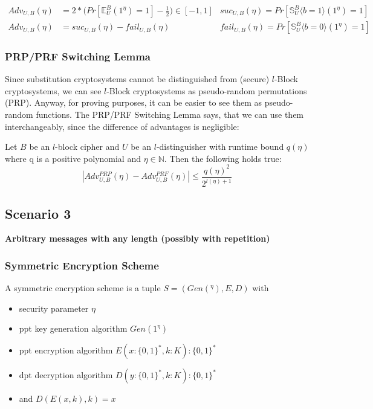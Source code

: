 \begin{align*}
    Adv_{U, B}(\eta) &= 2 * \bigg( Pr[\mathbb{E}_U^B(1^\eta) = 1] - \frac{1}{2} \bigg) \in [-1, 1]
    &suc_{U, B}(\eta) = Pr[\mathbb{S}_U^B\langle b=1\rangle (1^\eta) = 1]\\
    Adv_{U, B}(\eta) &= suc_{U, B}(\eta) - fail_{U, B}(\eta)
    &fail_{U, B}(\eta) = Pr[\mathbb{S}_U^B\langle b=0\rangle (1^\eta) = 1]  
\end{align*}

\hypertarget{prpprf-switching-lemma}{%
\subsubsection{PRP/PRF Switching Lemma}\label{prpprf-switching-lemma}}

Since substitution cryptosystems cannot be distinguished from (secure)
\(l\)-Block cryptosystems, we can see \(l\)-Block cryptosystems as
pseudo-random permutations (PRP). Anyway, for proving purposes, it can
be easier to see them as pseudo-random functions. The PRP/PRF Switching
Lemma says, that we can use them interchangeably, since the difference
of advantages is negligible:

Let \(B\) be an \(l\)-block cipher and \(U\) be an \(l\)-distinguisher
with runtime bound \(q(\eta)\) where q is a positive polynomial and
\(\eta \in \mathbb{N}\). Then the following holds true:
\[|Adv^{PRP}_{U,B}(\eta) - Adv^{PRF}_{U,B}(\eta)| \leq \frac{q(\eta)^2}{2^{l(\eta)+1}}\]

\hypertarget{scenario-3}{%
\subsection{Scenario 3}\label{scenario-3}}

\textbf{Arbitrary messages with any length (possibly with repetition)}

\hypertarget{symmetric-encryption-scheme}{%
\subsubsection{Symmetric Encryption
Scheme}\label{symmetric-encryption-scheme}}

A symmetric encryption scheme is a tuple \(S = (Gen(^\eta), E, D)\) with

\begin{itemize}
\tightlist
\item
  security parameter \(\eta\)
\item
  ppt key generation algorithm \(Gen(1^\eta)\)
\item
  ppt encryption algorithm \(E(x: \{0, 1\}^*, k: K) : \{0,1\}^*\)
\item
  dpt decryption algorithm \(D(y: \{0,1\}^*, k: K) : \{0,1\}^*\)
\item
  and \(D(E(x, k), k) = x\)
\end{itemize}

